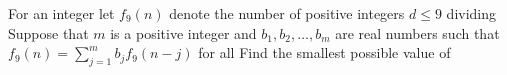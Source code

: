 For an integer  let $f_9(n)$ denote the number of positive integers $d\leq 9$ dividing   Suppose that $m$ is a positive integer and $b_1,b_2,\ldots,b_m$ are real numbers such that $f_9(n)=\textstyle\sum_{j=1}^mb_jf_9(n-j)$ for all   Find the smallest possible value of 